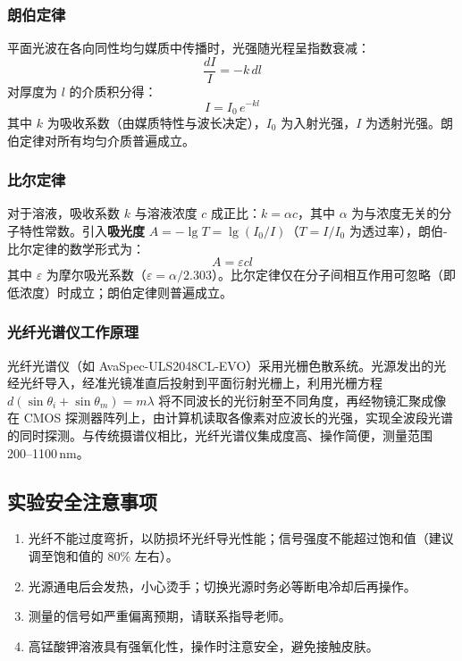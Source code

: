 \documentclass[dvipsnames, svgnames,a4paper,11pt]{article}
\begin{document}
\subsubsection{朗伯定律}

平面光波在各向同性均匀媒质中传播时，光强随光程呈指数衰减：
\begin{equation}
	\frac{dI}{I} = -k\,dl
\end{equation}
对厚度为 $l$ 的介质积分得：
\begin{equation}
	I = I_0\,e^{-kl}
\end{equation}
其中 $k$ 为吸收系数（由媒质特性与波长决定），$I_0$ 为入射光强，$I$ 为透射光强。朗伯定律对所有均匀介质普遍成立。

\subsubsection{比尔定律}

对于溶液，吸收系数 $k$ 与溶液浓度 $c$ 成正比：$k = \alpha c$，其中 $\alpha$ 为与浓度无关的分子特性常数。引入\textbf{吸光度} $A = -\lg T = \lg(I_0/I)$（$T=I/I_0$ 为透过率），朗伯-比尔定律的数学形式为：
\begin{equation}
	A = \varepsilon c l
\end{equation}
其中 $\varepsilon$ 为摩尔吸光系数（$\varepsilon = \alpha/2.303$）。比尔定律仅在分子间相互作用可忽略（即低浓度）时成立；朗伯定律则普遍成立。

\subsubsection{光纤光谱仪工作原理}

光纤光谱仪（如 AvaSpec-ULS2048CL-EVO）采用光栅色散系统。光源发出的光经光纤导入，经准光镜准直后投射到平面衍射光栅上，利用光栅方程 $d(\sin\theta_i + \sin\theta_m) = m\lambda$ 将不同波长的光衍射至不同角度，再经物镜汇聚成像在 CMOS 探测器阵列上，由计算机读取各像素对应波长的光强，实现全波段光谱的同时探测。与传统摄谱仪相比，光纤光谱仪集成度高、操作简便，测量范围 200--1100\,nm。

\subsection{实验安全注意事项}
\begin{enumerate}
	\item 光纤不能过度弯折，以防损坏光纤导光性能；信号强度不能超过饱和值（建议调至饱和值的 80\% 左右）。
	\item 光源通电后会发热，小心烫手；切换光源时务必等断电冷却后再操作。
	\item 测量的信号如严重偏离预期，请联系指导老师。
	\item 高锰酸钾溶液具有强氧化性，操作时注意安全，避免接触皮肤。
\end{enumerate}
\end{document}
